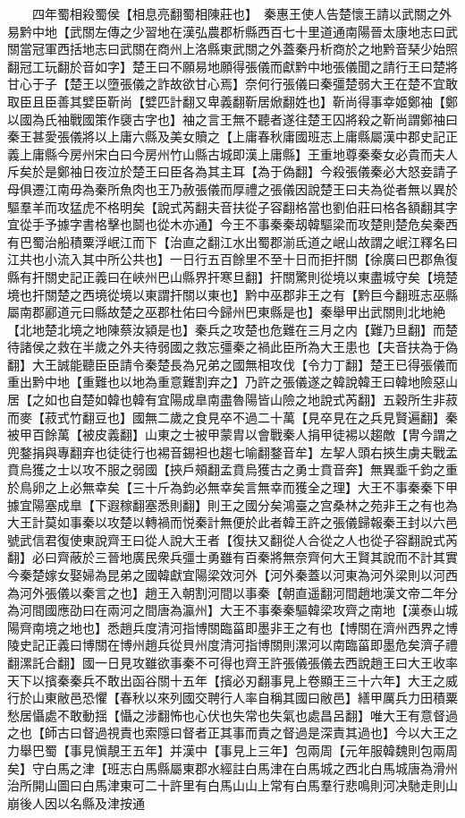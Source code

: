 　　四年蜀相殺蜀侯【相息亮翻蜀相陳莊也】　秦惠王使人告楚懷王請以武關之外易黔中地【武關左傳之少習地在漢弘農郡析縣西百七十里道通南陽晉太康地志曰武關當冠軍西括地志曰武關在商州上洛縣東武關之外蓋秦丹析商於之地黔音琹少始照翻冠工玩翻於音如字】楚王曰不願易地願得張儀而獻黔中地張儀聞之請行王曰楚將甘心于子【楚王以墮張儀之詐故欲甘心焉】奈何行張儀曰秦彊楚弱大王在楚不宜敢取臣且臣善其嬖臣靳尚【嬖匹計翻又卑義翻靳居焮翻姓也】靳尚得事幸姬鄭袖【鄭以國為氏袖戰國策作褏古字也】袖之言王無不聽者遂往楚王囚將殺之靳尚謂鄭袖曰秦王甚愛張儀將以上庸六縣及美女贖之【上庸春秋庸國班志上庸縣屬漢中郡史記正義上庸縣今房州宋白曰今房州竹山縣古城即漢上庸縣】王重地尊秦秦女必貴而夫人斥矣於是鄭袖日夜泣於楚王曰臣各為其主耳【為于偽翻】今殺張儀秦必大怒妾請子母俱遷江南毋為秦所魚肉也王乃赦張儀而厚禮之張儀因說楚王曰夫為從者無以異於驅羣羊而攻猛虎不格明矣【說式芮翻夫音扶從子容翻格當也劉伯莊曰格各額翻其字宜從手予據字書格擊也鬬也從木亦通】今王不事秦秦刼韓驅梁而攻楚則楚危矣秦西有巴蜀治船積粟浮岷江而下【治直之翻江水出蜀郡湔氐道之岷山故謂之岷江釋名曰江共也小流入其中所公共也】一日行五百餘里不至十日而拒扞關【徐廣曰巴郡魚復縣有扞關史記正義曰在峽州巴山縣界扞寒旦翻】扞關驚則從境以東盡城守矣【境楚境也扞關楚之西境從境以東謂扞關以東也】黔中巫郡非王之有【黔巨今翻班志巫縣屬南郡酈道元曰縣故楚之巫郡杜佑曰今歸州巴東縣是也】秦舉甲出武關則北地絶【北地楚北境之地陳蔡汝潁是也】秦兵之攻楚也危難在三月之内【難乃旦翻】而楚待諸侯之救在半歲之外夫待弱國之救忘彊秦之禍此臣所為大王患也【夫音扶為于偽翻】大王誠能聽臣臣請令秦楚長為兄弟之國無相攻伐【令力丁翻】楚王已得張儀而重出黔中地【重難也以地為重意難割弃之】乃許之張儀遂之韓說韓王曰韓地險惡山居【之如也自楚如韓也韓有宜陽成臯南盡魯陽皆山險之地說式芮翻】五穀所生非菽而麥【菽式竹翻豆也】國無二歲之食見卒不過二十萬【見卒見在之兵見賢遍翻】秦被甲百餘萬【被皮義翻】山東之士被甲蒙胄以會戰秦人捐甲徒裼以趨敵【冑今謂之兜鍪捐與專翻弃也徒徒行也裼音錫袒也趨七喻翻鍪音牟】左挈人頭右挾生虜夫戰孟賁烏獲之士以攻不服之弱國【挾戶頰翻孟賁烏獲古之勇士賁音奔】無異埀千鈞之重於鳥卵之上必無幸矣【三十斤為鈞必無幸矣言無幸而獲全之理】大王不事秦秦下甲據宜陽塞成臯【下遐稼翻塞悉則翻】則王之國分矣鴻臺之宫桑林之苑非王之有也為大王計莫如事秦以攻楚以轉禍而悦秦計無便於此者韓王許之張儀歸報秦王封以六邑號武信君復使東說齊王曰從人說大王者【復扶又翻從人合從之人也從子容翻說式芮翻】必曰齊蔽於三晉地廣民衆兵彊士勇雖有百秦將無奈齊何大王賢其說而不計其實今秦楚嫁女娶婦為昆弟之國韓獻宜陽梁效河外【河外秦蓋以河東為河外梁則以河西為河外張儀以秦言之也】趙王入朝割河間以事秦【朝直遥翻河間趙地漢文帝二年分為河間國應劭曰在兩河之間唐為瀛州】大王不事秦秦驅韓梁攻齊之南地【漢泰山城陽齊南境之地也】悉趙兵度清河指博關臨菑即墨非王之有也【博關在濟州西界之博陵史記正義曰博關在博州趙兵從貝州度清河指博關則漯河以南臨菑即墨危矣濟子禮翻漯託合翻】國一日見攻雖欲事秦不可得也齊王許張儀張儀去西說趙王曰大王收率天下以擯秦秦兵不敢出函谷關十五年【擯必刃翻事見上卷顯王三十六年】大王之威行於山東敝邑恐懼【春秋以來列國交聘行人率自稱其國曰敝邑】繕甲厲兵力田積粟愁居懾處不敢動揺【懾之涉翻怖也心伏也失常也失氣也處昌呂翻】唯大王有意督過之也【師古曰督過視責也索隱曰督者正其事而責之督過是深責其過也】今以大王之力舉巴蜀【事見愼靚王五年】并漢中【事見上三年】包兩周【元年服韓魏則包兩周矣】守白馬之津【班志白馬縣屬東郡水經註白馬津在白馬城之西北白馬城唐為滑州治所開山圖曰白馬津東可二十許里有白馬山山上常有白馬羣行悲鳴則河决馳走則山崩後人因以名縣及津按通